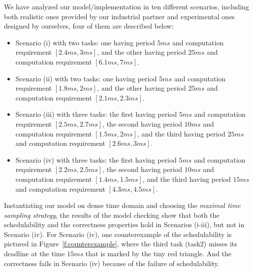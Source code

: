 \documentclass{llncs}
\begin{document}
We have analyzed our model/implementation in ten different scenarios,
including both realistic ones provided by our industrial partner and
experimental ones designed by ourselves, four of them are described
below:
\begin{itemize}
\item Scenario (i) with two tasks: one having period $5ms$ and
  computation requirement $[2.4ms, 3ms]$, and the other having period
  $25ms$ and computation requirement $[6.1ms, 7ms]$.
\item Scenario (ii) with two tasks: one having period $5ms$ and
  computation requirement $[1.8ms, 2ms]$, and the other having period
  $25ms$ and computation requirement $[2.1ms, 2.3ms]$.
\item Scenario (iii) with three tasks: the first having period $5ms$
  and computation requirement $[2.5ms, 2.7ms]$, the second having
  period $10ms$ and computation requirement $[1.5ms, 2ms]$, and the
  third having period $25ms$ and computation requirement $[2.6ms,
    3ms]$.
\item Scenario (iv) with three tasks: the first having period $5ms$
  and computation requirement $[2.2ms, 2.5ms]$, the second having
  period $10ms$ and computation requirement $[1.4ms, 1.5ms]$, and the
  third having period $15ms$ and computation requirement $[4.3ms,
    4.5ms]$.
\end{itemize}

Instantiating our model on dense time domain and choosing the
\emph{maximal time sampling strategy}, the results of the model
checking show that both the schedulability and the correctness
properties hold in Scenarios (i-iii), but not in Scenario (iv). For
Scenario (iv), one counterexample of the schedulability is pictured in
Figure~\ref{f:counterexample}, where the third task (task$2$) misses
its deadline at the time $15ms$ that is marked by the tiny red
triangle. And the correctness fails in Scenario (iv) because of the
failure of schedulability.
\end{document}
